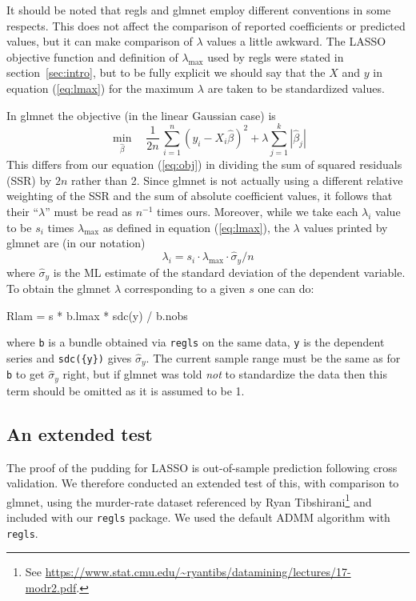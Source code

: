 \documentclass{article}
\begin{document}
It should be noted that \textsf{regls} and \textsf{glmnet} employ
different conventions in some respects. This does not affect the
comparison of reported coefficients or predicted values, but it can
make comparison of $\lambda$ values a little awkward. The LASSO
objective function and definition of $\lambda_{\max}$ used by
\textsf{regls} were stated in section~\ref{sec:intro}, but to be fully
explicit we should say that the $X$ and $y$ in equation
(\ref{eq:lmax}) for the maximum $\lambda$ are taken to be standardized
values.

In \textsf{glmnet} the objective (in the linear Gaussian case) is
\[
   \min_{\hat{\beta}} \quad \frac{1}{2n}\,
  \sum_{i=1}^n (y_i - X_i\hat{\beta})^2 + \lambda \sum_{j=1}^k |\hat{\beta}_j| 
\]
This differs from our equation (\ref{eq:obj}) in dividing the sum of
squared residuals (SSR) by $2n$ rather than 2. Since \textsf{glmnet}
is not actually using a different relative weighting of the SSR and
the sum of absolute coefficient values, it follows that their
``$\lambda$'' must be read as $n^{-1}$ times ours. Moreover, while we
take each $\lambda_i$ value to be $s_i$ times $\lambda_{\max}$ as
defined in equation (\ref{eq:lmax}), the $\lambda$ values printed by
\textsf{glmnet} are (in our notation)
\[
\lambda_i = s_i \cdot \lambda_{\max} \cdot \hat{\sigma}_y / n 
\]
where $\hat{\sigma}_y$ is the ML estimate of the standard deviation of
the dependent variable. To obtain the \textsf{glmnet} $\lambda$
corresponding to a given $s$ one can do:
\begin{code}
Rlam = s * b.lmax * sdc({y}) / b.nobs
\end{code}
where \texttt{b} is a bundle obtained via \texttt{regls} on the same
data, \texttt{y} is the dependent series and \texttt{sdc(\{y\})} gives
$\hat{\sigma}_y$. The current sample range must be the same as for
\texttt{b} to get $\hat{\sigma}_y$ right, but if \textsf{glmnet} was
told \textit{not} to standardize the data then this term should be
omitted as it is assumed to be 1.

\subsection*{An extended test}

The proof of the pudding for LASSO is out-of-sample prediction
following cross validation. We therefore conducted an extended test of
this, with comparison to \textsf{glmnet}, using the murder-rate
dataset referenced by Ryan Tibshirani\footnote{See
  \url{https://www.stat.cmu.edu/~ryantibs/datamining/lectures/17-modr2.pdf}.}
and included with our \texttt{regls} package. We used the default ADMM
algorithm with \texttt{regls}.
\end{document}
